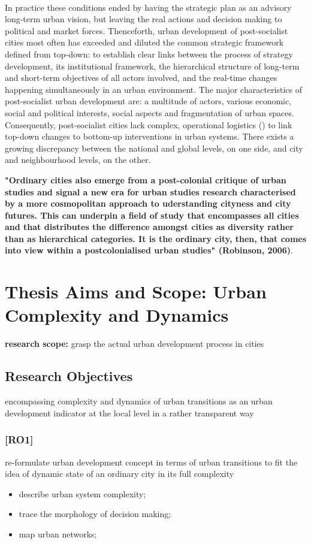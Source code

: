 \documentclass[11pt]{report}
\begin{document}
\\
In practice these conditions ended by having the strategic plan as an advisory long-term urban vision, but leaving the real actions and decision making to political and market forces. Thenceforth, urban development of post-socialist cities most often has exceeded and diluted the common strategic framework defined from top-down: to establish clear links between the process of strategy development, its institutional framework, the hierarchical structure of long-term and short-term objectives of all actors involved, and the real-time changes happening simultaneously in an urban environment. The major characteristics of post-socialist urban development are: a multitude of actors, various economic, social and political interests, social aspects and fragmentation of urban spaces. Consequently, post-socialist cities lack complex, operational logistics (\href{check!!!Repetti et al. 2010}{\citealt{check!!!Repetti et al. 2010}}) to link top-down changes to bottom-up interventions in urban systems. There exists a growing discrepancy between the national and global levels, on one side, and city and neighbourhood levels, on the other. 

\textbf{"Ordinary cities also emerge from a post-colonial critique of urban studies and signal a new era for urban studies research characterised by a more cosmopolitan approach to uderstanding cityness and city futures. This can underpin a field of study that encompasses all cities and that distributes the difference amongst cities as diversity rather than as hierarchical categories. It is the ordinary city, then, that comes into view within a postcolonialised urban studies" (Robinson, 2006)}.

\section{Thesis Aims and Scope: Urban Complexity and Dynamics}
\textbf{research scope:} grasp the actual urban development process in cities

\subsection{Research Objectives}
encompassing complexity and dynamics of urban transitions as an urban development indicator at the local level in a rather transparent way

\subsubsection{[RO1]}
re-formulate urban development concept in terms of urban transitions to fit the idea of dynamic state of an ordinary city in its full complexity
\begin{itemize}
\item describe urban system complexity;
\item trace the morphology of decision making;
\item map urban networks;
\end{itemize}
\end{document}
